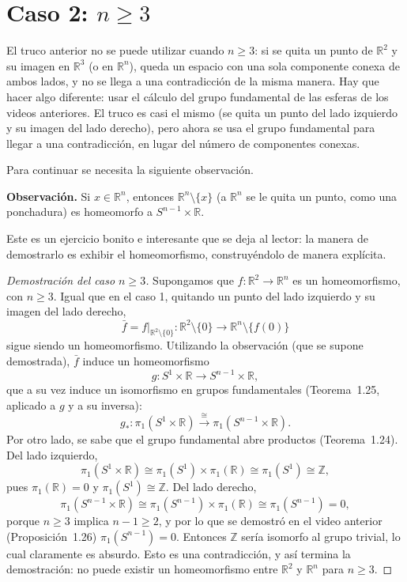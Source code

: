 \documentclass[11pt]{article}
\begin{document}
\section*{Caso 2: $n\geq 3$}

El truco anterior no se puede utilizar cuando $n\geq 3$: si se quita un punto de $\mathbb{R}^2$ y su imagen en $\mathbb{R}^3$ (o en $\mathbb{R}^n$), queda un espacio con una sola componente conexa de ambos lados, y no se llega a una contradicción de la misma manera. Hay que hacer algo diferente: usar el cálculo del grupo fundamental de las esferas de los videos anteriores. El truco es casi el mismo (se quita un punto del lado izquierdo y su imagen del lado derecho), pero ahora se usa el grupo fundamental para llegar a una contradicción, en lugar del número de componentes conexas.

Para continuar se necesita la siguiente observación.

\medskip\noindent\textbf{Observación.} Si $x\in\mathbb{R}^n$, entonces $\mathbb{R}^n\setminus\{x\}$ (a $\mathbb{R}^n$ se le quita un punto, como una ponchadura) es homeomorfo a $S^{n-1}\times\mathbb{R}$.

Este es un ejercicio bonito e interesante que se deja al lector: la manera de demostrarlo es exhibir el homeomorfismo, construyéndolo de manera explícita.

\begin{proof}[Demostración del caso $n\geq 3$]
Supongamos que $f\colon\mathbb{R}^2\to\mathbb{R}^n$ es un homeomorfismo, con $n\geq 3$. Igual que en el caso 1, quitando un punto del lado izquierdo y su imagen del lado derecho,
\[
  \bar f=f|_{\mathbb{R}^2\setminus\{0\}}\colon\mathbb{R}^2\setminus\{0\}\longrightarrow\mathbb{R}^n\setminus\{f(0)\}
\]
sigue siendo un homeomorfismo. Utilizando la observación (que se supone demostrada), $\bar f$ induce un homeomorfismo
\[
  g\colon S^1\times\mathbb{R}\longrightarrow S^{n-1}\times\mathbb{R},
\]
que a su vez induce un isomorfismo en grupos fundamentales (Teorema~1.25, aplicado a $g$ y a su inversa):
\[
  g_*\colon\pi_1(S^1\times\mathbb{R})\xrightarrow{\ \cong\ }\pi_1(S^{n-1}\times\mathbb{R}).
\]
Por otro lado, se sabe que el grupo fundamental abre productos (Teorema~1.24). Del lado izquierdo,
\[
  \pi_1(S^1\times\mathbb{R})\cong\pi_1(S^1)\times\pi_1(\mathbb{R})\cong\pi_1(S^1)\cong\mathbb{Z},
\]
pues $\pi_1(\mathbb{R})=0$ y $\pi_1(S^1)\cong\mathbb{Z}$. Del lado derecho,
\[
  \pi_1(S^{n-1}\times\mathbb{R})\cong\pi_1(S^{n-1})\times\pi_1(\mathbb{R})\cong\pi_1(S^{n-1})=0,
\]
porque $n\geq 3$ implica $n-1\geq 2$, y por lo que se demostró en el video anterior (Proposición~1.26) $\pi_1(S^{n-1})=0$. Entonces $\mathbb{Z}$ sería isomorfo al grupo trivial, lo cual claramente es absurdo. Esto es una contradicción, y así termina la demostración: no puede existir un homeomorfismo entre $\mathbb{R}^2$ y $\mathbb{R}^n$ para $n\geq 3$.
\end{proof}
\end{document}
